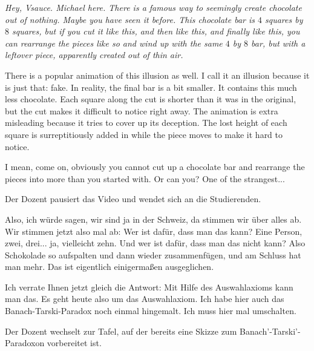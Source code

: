\begin{spoken-clean}[00:00:28 - 00:01:46]
{\itshape Hey, Vsauce. Michael here. There is a famous way to seemingly create chocolate out of nothing. Maybe you have seen it before. This chocolate bar is $4$ squares by $8$ squares, but if you cut it like this, and then like this, and finally like this, you can rearrange the pieces like so and wind up with the same $4$ by $8$ bar, but with a leftover piece, apparently created out of thin air.

There is a popular animation of this illusion as well. I call it an illusion because it is just that: fake. In reality, the final bar is a bit smaller. It contains this much less chocolate. Each square along the cut is shorter than it was in the original, but the cut makes it difficult to notice right away. The animation is extra misleading because it tries to cover up its deception. The lost height of each square is surreptitiously added in while the piece moves to make it hard to notice.

I mean, come on, obviously you cannot cut up a chocolate bar and rearrange the pieces into more than you started with. Or can you? One of the strangest...}
\end{spoken-clean}

\begin{meta-note}
Der Dozent pausiert das Video und wendet sich an die Studierenden.
\end{meta-note}

\begin{spoken-clean}[00:01:46 - 00:02:32]
Also, ich würde sagen, wir sind ja in der Schweiz, da stimmen wir über alles ab. Wir stimmen jetzt also mal ab: Wer ist dafür, dass man das kann? Eine Person, zwei, drei... ja, vielleicht zehn. Und wer ist dafür, dass man das nicht kann? Also Schokolade so aufspalten und dann wieder zusammenfügen, und am Schluss hat man mehr. Das ist eigentlich einigermaßen ausgeglichen.

Ich verrate Ihnen jetzt gleich die Antwort: Mit Hilfe des Auswahlaxioms kann man das. Es geht heute also um das Auswahlaxiom. Ich habe hier auch das Banach-Tarski-Paradox noch einmal hingemalt. Ich muss hier mal umschalten.
\end{spoken-clean}

\begin{meta-note}[Tafelübergang]

Der Dozent wechselt zur Tafel, auf der bereits eine Skizze zum Banach'-Tarski'-Paradoxon vorbereitet ist.

\end{meta-note}

